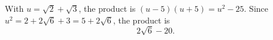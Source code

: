 With $u=\sqrt2+\sqrt3$, the product is $(u-5)(u+5)=u^2-25$. Since $u^2=2+2\sqrt6+3=5+2\sqrt6$, the product is
\[
\boxed{2\sqrt6-20}.
\]
